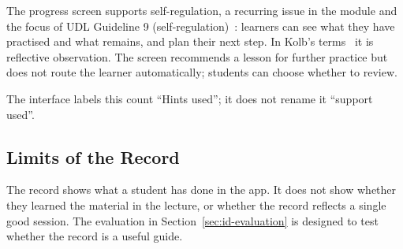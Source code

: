 The progress screen supports self-regulation, a recurring issue in the module and the focus of UDL Guideline 9 (self-regulation)~\cite{CAST2018}: learners can see what they have practised and what remains, and plan their next step. In Kolb's terms~\cite{Kolb1984} it is reflective observation. The screen recommends a lesson for further practice but does not route the learner automatically; students can choose whether to review.
 
The interface labels this count ``Hints used''; it does not rename it ``support used''.

\subsection{Limits of the Record}
The record shows what a student has done in the app. It does not show whether they learned the material in the lecture, or whether the record reflects a single good session. The evaluation in Section~\ref{sec:id-evaluation} is designed to test whether the record is a useful guide.